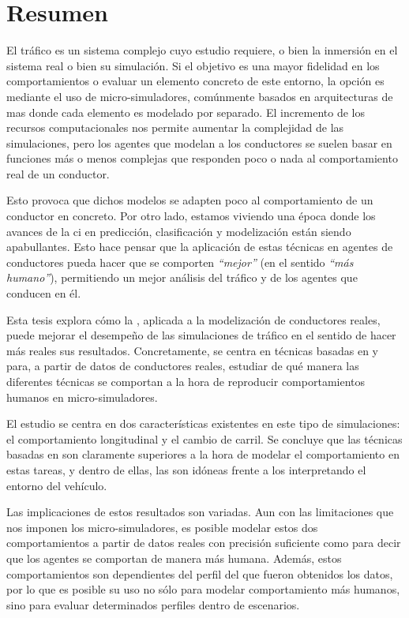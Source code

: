 \cleardoublepage
\thispagestyle{empty}
\chapter*{Resumen}
\begin{fullwidth}
	El tráfico es un sistema complejo cuyo estudio requiere, o bien la inmersión en el sistema real o bien su simulación. Si el objetivo es una mayor fidelidad en los comportamientos o evaluar un elemento concreto de este entorno, la opción es mediante el uso de micro-simuladores, comúnmente basados en arquitecturas de \Acrfull{mas} donde cada elemento es modelado por separado. El incremento de los recursos computacionales nos permite aumentar la complejidad de las simulaciones, pero los agentes que modelan a los conductores se suelen basar en funciones más o menos complejas que responden poco o nada al comportamiento real de un conductor.
	
	Esto provoca que dichos modelos se adapten poco al comportamiento de un conductor en concreto. Por otro lado, estamos viviendo una época donde los avances de la \Acrfull{ci} en predicción, clasificación y modelización están siendo apabullantes. Esto hace pensar que la aplicación de estas técnicas en agentes de conductores pueda hacer que se comporten \textit{\enquote{mejor}} (en el sentido \textit{\enquote{más humano}}), permitiendo un mejor análisis del tráfico y de los agentes que conducen en él.
	
	Esta tesis explora cómo la , aplicada a la modelización de conductores reales, puede mejorar el desempeño de las simulaciones de tráfico en el sentido de hacer más reales sus resultados. Concretamente, se centra en técnicas basadas en  y  para, a partir de datos de conductores reales, estudiar de qué manera las diferentes técnicas se comportan a la hora de reproducir comportamientos humanos en micro-simuladores.
	
	El estudio se centra en dos características existentes en este tipo de simulaciones: el comportamiento longitudinal y el cambio de carril. Se concluye que las técnicas basadas en  son claramente superiores a la hora de modelar el comportamiento en estas tareas, y dentro de ellas, las  son idóneas frente a los  interpretando el entorno del vehículo.
	
	Las implicaciones de estos resultados son variadas. Aun con las limitaciones que nos imponen los micro-simuladores, es posible modelar estos dos comportamientos a partir de datos reales con precisión suficiente como para decir que los agentes se comportan de manera más humana. Además, estos comportamientos son dependientes del perfil del que fueron obtenidos los datos, por lo que es posible su uso no sólo para modelar comportamiento más humanos, sino para evaluar determinados perfiles dentro de escenarios.
	

\end{fullwidth}
